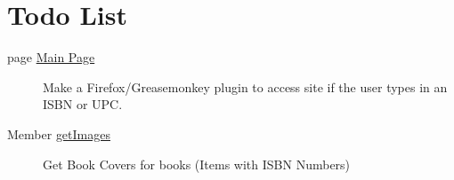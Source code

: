 \hypertarget{todo}{}\section{Todo List}\label{todo}
\label{todo__todo000001}
\hypertarget{todo__todo000001}{}
 \begin{description}
\item[page \hyperlink{index}{Main Page} ]Make a Firefox/Greasemonkey plugin to access site if the user types in an ISBN or UPC.

\end{description}


\label{todo__todo000002}
\hypertarget{todo__todo000002}{}
 \begin{description}
\item[Member \hyperlink{product_8inc_9dbb778854cfe105058d7161ca8f058c}{getImages} ]Get Book Covers for books (Items with ISBN Numbers) \end{description}
